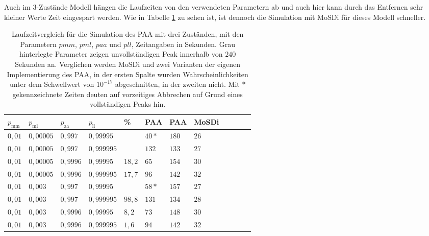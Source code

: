 Auch im 3-Zustände Modell hängen die Laufzeiten von den verwendeten Parametern ab und auch hier kann durch das Entfernen sehr kleiner Werte Zeit eingespart werden. Wie in Tabelle \ref{3s_laufzeit_paa} zu sehen ist, ist dennoch die Simulation mit MoSDi für dieses Modell schneller.

\begin{table}[h]
\centering 
\caption[Laufzeitvergleich für die Simulation des PAA mit drei Zuständen]{Laufzeitvergleich für die Simulation des PAA mit drei Zuständen, mit den Parametern $pmm$, $pml$, $paa$ und $pll$, Zeitangaben in Sekunden. Grau hinterlegte Parameter zeigen unvollständigen Peak innerhalb von $240$ Sekunden an. Verglichen werden MoSDi und zwei Varianten der eigenen Implementierung des PAA, in der ersten Spalte wurden Wahrscheinlichkeiten unter dem Schwellwert von $10^{-17}$ abgeschnitten, in der zweiten nicht. Mit $*$ gekennzeichnete Zeiten deuten auf vorzeitiges Abbrechen auf Grund eines vollständigen Peaks hin.}
\label{3s_laufzeit_paa}
\begin{tabular}{|l|l|l|l||l||l|l|l|l|l|l|l|}
\hline
$p_\text{mm}$ & $p_\text{ml}$ & $p_\text{aa}$ & $p_\text{ll}$ & \% & PAA & PAA & MoSDi \\ \hline \hline
$ 0,01 $ & $0,00005$ & $0,997$  & $0,99995$  &&  $40* $ & $180  $ & $26 $  \\ \hline
$ 0,01 $ & $0,00005$ & $0,997$  & $0,999995$ &&  $132  $ & $133  $ & $27 $  \\ \hline
\cellcolor{gray!25}$ 0,01 $ & \cellcolor{gray!25}$0,00005$ & \cellcolor{gray!25}$0,9996$ & \cellcolor{gray!25}$0,99995$  &$18,2$& $65 $ & $154  $ & $30 $  \\ \hline
\cellcolor{gray!25}$ 0,01 $ & \cellcolor{gray!25}$0,00005$ & \cellcolor{gray!25}$0,9996$ & \cellcolor{gray!25}$0,999995$ &$17,7$& $96 $ & $142  $ & $ 32 $  \\ \hline
$ 0,01 $ & $0,003 $  & $0,997$  & $0,99995$  &&  $58*  $ & $157  $ & $27 $  \\ \hline
\cellcolor{gray!25}$ 0,01 $ & \cellcolor{gray!25}\cellcolor{gray!25}$0,003 $  & \cellcolor{gray!25}$0,997$  & \cellcolor{gray!25}$0,999995$ &$98,8$&$131  $ & $134  $ & $ 28 $  \\ \hline
\cellcolor{gray!25}$ 0,01 $ & \cellcolor{gray!25}$0,003 $  & \cellcolor{gray!25}\cellcolor{gray!25}$0,9996$ & \cellcolor{gray!25}$0,99995$  &$8,2$& $73  $ & $148  $ & $ 30  $  \\ \hline
\cellcolor{gray!25}$ 0,01 $ & \cellcolor{gray!25}$0,003 $  & \cellcolor{gray!25}\cellcolor{gray!25}$0,9996$ & \cellcolor{gray!25}$0,999995$ &$1,6$& $94  $ & $142  $ & $32 $  \\ \hline

\end{tabular}
\end{table}
